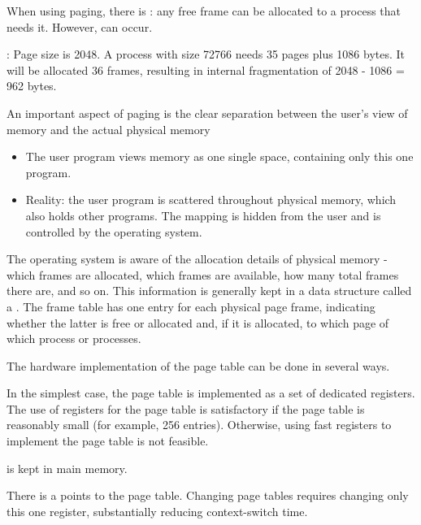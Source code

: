     \par When using paging, there is : any free frame can be allocated to a process that needs it. However,  can occur.

    \par {}: Page size is 2048. A process with size 72766 needs 35 pages plus 1086 bytes. It will be allocated 36 frames, resulting in internal fragmentation of 2048 - 1086 = 962 bytes.

    \par An important aspect of paging is the clear separation between the user's view of memory and the actual physical memory
    \begin{itemize}
      \item The user program views memory as one single space, containing only this one program. 
      \item Reality: the user program is scattered throughout physical memory, which also holds other
programs. The mapping is hidden from the user and is controlled by the operating system.
    \end{itemize}

    \par The operating system is aware of the allocation details of physical memory - which frames are allocated, which frames are available, how many total frames there are, and so on.  This information is generally kept in a data structure called a . The frame table has one entry for each physical page frame, indicating whether the latter is free or allocated and, if it is allocated, to which page of which process or processes.

    \par The hardware implementation of the page table can be done in several ways.
    
      \par In the simplest case, the page table is implemented as a set of dedicated registers. The use of registers for the page table is satisfactory if the page table is reasonably small (for example, 256 entries). Otherwise, using fast registers to implement the page table is not feasible.

    \par {} is kept in main memory.
    \par There is a  points to the page table. Changing page tables requires changing only this one register, substantially reducing context-switch time.

